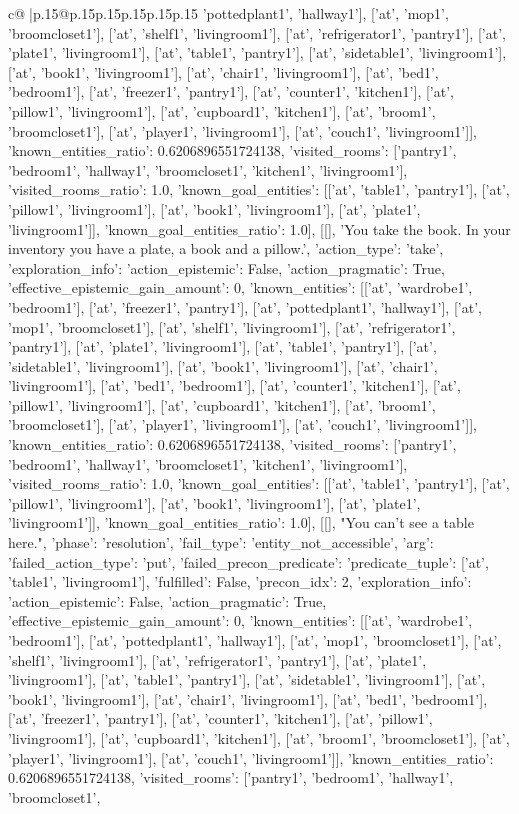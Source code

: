 \documentclass{article}
\begin{document}
{\begin{supertabular}{c@{$\;$}|p{.15\linewidth}@{}p{.15\linewidth}p{.15\linewidth}p{.15\linewidth}p{.15\linewidth}p{.15\linewidth}}
{{{'pottedplant1', 'hallway1'], ['at', 'mop1', 'broomcloset1'], ['at', 'shelf1', 'livingroom1'], ['at', 'refrigerator1', 'pantry1'], ['at', 'plate1', 'livingroom1'], ['at', 'table1', 'pantry1'], ['at', 'sidetable1', 'livingroom1'], ['at', 'book1', 'livingroom1'], ['at', 'chair1', 'livingroom1'], ['at', 'bed1', 'bedroom1'], ['at', 'freezer1', 'pantry1'], ['at', 'counter1', 'kitchen1'], ['at', 'pillow1', 'livingroom1'], ['at', 'cupboard1', 'kitchen1'], ['at', 'broom1', 'broomcloset1'], ['at', 'player1', 'livingroom1'], ['at', 'couch1', 'livingroom1']], 'known_entities_ratio': 0.6206896551724138, 'visited_rooms': ['pantry1', 'bedroom1', 'hallway1', 'broomcloset1', 'kitchen1', 'livingroom1'], 'visited_rooms_ratio': 1.0, 'known_goal_entities': [['at', 'table1', 'pantry1'], ['at', 'pillow1', 'livingroom1'], ['at', 'book1', 'livingroom1'], ['at', 'plate1', 'livingroom1']], 'known_goal_entities_ratio': 1.0}}], [[], 'You take the book. In your inventory you have a plate, a book and a pillow.', {'action_type': 'take', 'exploration_info': {'action_epistemic': False, 'action_pragmatic': True, 'effective_epistemic_gain_amount': 0, 'known_entities': [['at', 'wardrobe1', 'bedroom1'], ['at', 'freezer1', 'pantry1'], ['at', 'pottedplant1', 'hallway1'], ['at', 'mop1', 'broomcloset1'], ['at', 'shelf1', 'livingroom1'], ['at', 'refrigerator1', 'pantry1'], ['at', 'plate1', 'livingroom1'], ['at', 'table1', 'pantry1'], ['at', 'sidetable1', 'livingroom1'], ['at', 'book1', 'livingroom1'], ['at', 'chair1', 'livingroom1'], ['at', 'bed1', 'bedroom1'], ['at', 'counter1', 'kitchen1'], ['at', 'pillow1', 'livingroom1'], ['at', 'cupboard1', 'kitchen1'], ['at', 'broom1', 'broomcloset1'], ['at', 'player1', 'livingroom1'], ['at', 'couch1', 'livingroom1']], 'known_entities_ratio': 0.6206896551724138, 'visited_rooms': ['pantry1', 'bedroom1', 'hallway1', 'broomcloset1', 'kitchen1', 'livingroom1'], 'visited_rooms_ratio': 1.0, 'known_goal_entities': [['at', 'table1', 'pantry1'], ['at', 'pillow1', 'livingroom1'], ['at', 'book1', 'livingroom1'], ['at', 'plate1', 'livingroom1']], 'known_goal_entities_ratio': 1.0}}], [[], "You can't see a table here.", {'phase': 'resolution', 'fail_type': 'entity_not_accessible', 'arg': {'failed_action_type': 'put', 'failed_precon_predicate': {'predicate_tuple': ['at', 'table1', 'livingroom1'], 'fulfilled': False, 'precon_idx': 2}}, 'exploration_info': {'action_epistemic': False, 'action_pragmatic': True, 'effective_epistemic_gain_amount': 0, 'known_entities': [['at', 'wardrobe1', 'bedroom1'], ['at', 'pottedplant1', 'hallway1'], ['at', 'mop1', 'broomcloset1'], ['at', 'shelf1', 'livingroom1'], ['at', 'refrigerator1', 'pantry1'], ['at', 'plate1', 'livingroom1'], ['at', 'table1', 'pantry1'], ['at', 'sidetable1', 'livingroom1'], ['at', 'book1', 'livingroom1'], ['at', 'chair1', 'livingroom1'], ['at', 'bed1', 'bedroom1'], ['at', 'freezer1', 'pantry1'], ['at', 'counter1', 'kitchen1'], ['at', 'pillow1', 'livingroom1'], ['at', 'cupboard1', 'kitchen1'], ['at', 'broom1', 'broomcloset1'], ['at', 'player1', 'livingroom1'], ['at', 'couch1', 'livingroom1']], 'known_entities_ratio': 0.6206896551724138, 'visited_rooms': ['pantry1', 'bedroom1', 'hallway1', 'broomcloset1', }}}
\end{supertabular}}
\end{document}
